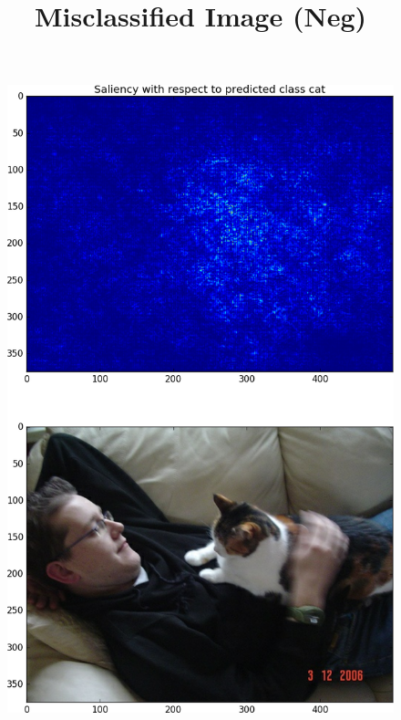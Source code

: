 \documentclass[12pt]{article}
\begin{document}
\begin{enumerate}
\begin{figure}[H]
		\includegraphics[height=0.8\textheight]{../Figures/hw2_4_vii_test_cat_000516.png}
	\end{figure}
	\begin{figure}[H]
		\centering
		\title{\bf Misclassified Image (Neg)}
		\\ \vspace{2.5mm}

\end{figure}
\end{enumerate}
\end{document}
